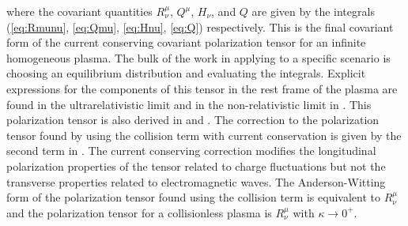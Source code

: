 where the covariant quantities $R^\mu_\nu$, $Q^\mu$, $H_\nu$, and $Q$ are given by the integrals (\ref{eq:Rmunu}, \ref{eq:Qmu}, \ref{eq:Hnu}, \ref{eq:Q}) respectively. 
This is the final covariant form of the current conserving covariant polarization tensor for an infinite homogeneous plasma. The bulk of the work in applying  to a specific scenario is choosing an equilibrium distribution and evaluating the integrals. Explicit expressions for the components of this tensor in the rest frame of the plasma are found in the ultrarelativistic limit  and in the non-relativistic limit  in \cite{Formanek:2021blc}.
This polarization tensor is also derived in \cite{Carrington:2003je} and \cite{Schenke:2006xu}. The correction to the polarization tensor found by using the collision term with current conservation  is given by the second term in . The current conserving correction modifies the longitudinal polarization properties of the tensor related to charge fluctuations but not the transverse properties related to electromagnetic waves. The Anderson-Witting form of the polarization tensor found using the collision term  is equivalent to $R^\mu_\nu$ and the polarization tensor for a collisionless plasma is $R^\mu_\nu$ with $\kappa \rightarrow 0^+$.




